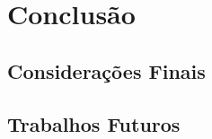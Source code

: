 \chapter{Conclusão}
\label{sec-conclusoes}




\section{Considerações Finais}
\label{sec-conclusoes-consideracoes}



\section{Trabalhos Futuros}
\label{sec-conclusoes-trabalhosfuturos}


